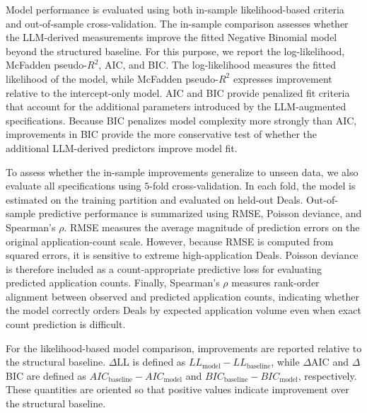 Model performance is evaluated using both in-sample likelihood-based criteria and out-of-sample cross-validation. The in-sample comparison assesses whether the LLM-derived measurements improve the fitted Negative Binomial model beyond the structured baseline. For this purpose, we report the log-likelihood, McFadden pseudo-$R^2$, AIC, and BIC. The log-likelihood measures the fitted likelihood of the model, while McFadden pseudo-$R^2$ expresses improvement relative to the intercept-only model. AIC and BIC provide penalized fit criteria that account for the additional parameters introduced by the LLM-augmented specifications. Because BIC penalizes model complexity more strongly than AIC, improvements in BIC provide the more conservative test of whether the additional LLM-derived predictors improve model fit.

To assess whether the in-sample improvements generalize to unseen data, we also evaluate all specifications using $5$-fold cross-validation. In each fold, the model is estimated on the training partition and evaluated on held-out Deals. Out-of-sample predictive performance is summarized using RMSE, Poisson deviance, and Spearman's $\rho$. RMSE measures the average magnitude of prediction errors on the original application-count scale. However, because RMSE is computed from squared errors, it is sensitive to extreme high-application Deals. Poisson deviance is therefore included as a count-appropriate predictive loss for evaluating predicted application counts. Finally, Spearman's $\rho$ measures rank-order alignment between observed and predicted application counts, indicating whether the model correctly orders Deals by expected application volume even when exact count prediction is difficult.

For the likelihood-based model comparison, improvements are reported relative to the structural baseline. $\Delta$LL is defined as $LL_{\text{model}} - LL_{\text{baseline}}$, while $\Delta$AIC and $\Delta$BIC are defined as $AIC_{\text{baseline}} - AIC_{\text{model}}$ and $BIC_{\text{baseline}} - BIC_{\text{model}}$, respectively. These quantities are oriented so that positive values indicate improvement over the structural baseline.




